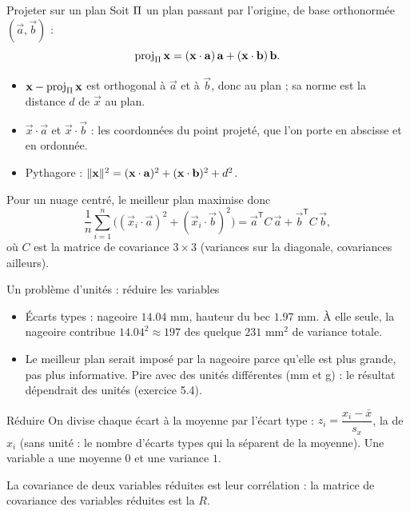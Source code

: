 \begin{frame}{Projeter sur un plan}
  \small Soit $\Pi$ un plan passant par l'origine, de base orthonormée
  $(\vec a,\vec b)$ :
  \[
    \operatorname{proj}_{\Pi}\mathbf{x}=(\mathbf{x}\cdot\mathbf{a})\,\mathbf{a}+(\mathbf{x}\cdot\mathbf{b})\,\mathbf{b} .
  \]
  \begin{itemize}
    \item $\mathbf{x}-\operatorname{proj}_{\Pi}\mathbf{x}$ est orthogonal à $\vec a$ et à
      $\vec b$, donc au plan ; sa norme est la distance $d$ de $\vec x$ au
      plan.
    \item $\vec x\cdot\vec a$ et $\vec x\cdot\vec b$ : les coordonnées du
      point projeté, que l'on porte en abscisse et en ordonnée.
    \item Pythagore :
      $\lVert \mathbf{x} \rVert^2=(\mathbf{x}\cdot\mathbf{a})^2+(\mathbf{x}\cdot\mathbf{b})^2+d^2$.
  \end{itemize}
  Pour un nuage centré, le meilleur plan maximise donc
  \[
    \frac1n\sum_{i=1}^n\Big((\vec x_i\cdot\vec a)^2+(\vec x_i\cdot\vec b)^2\Big)
    =\vec a^{\mathsf T}C\,\vec a+\vec b^{\mathsf T}C\,\vec b,
  \]
  où $C$ est la matrice de covariance $3\times3$ (variances sur la
  diagonale, covariances ailleurs).
\end{frame}

\begin{frame}{Un problème d'unités : réduire les variables}
  \small
  \begin{itemize}
    \item Écarts types : nageoire $\num{14.04}$ mm, hauteur du bec
      $\num{1.97}$ mm. À elle seule, la nageoire contribue
      $\num{14.04}^2\approx197$ des quelque $231$ mm$^2$ de variance totale.
    \item Le meilleur plan serait imposé par la nageoire parce qu'elle est
      plus grande, pas plus informative. Pire avec des unités différentes
      (mm et g) : le résultat dépendrait des unités (exercice 5.4).
  \end{itemize}
  \begin{Enonce}{Réduire}
    On divise chaque écart à la moyenne par l'écart type :
    $z_i=\dfrac{x_i-\bar x}{s_x}$, la  de $x_i$ (sans unité :
    le nombre d'écarts types qui la séparent de la moyenne). Une variable
     a une moyenne $0$ et une variance $1$.
  \end{Enonce}
  La covariance de deux variables réduites est leur corrélation : la
  matrice de covariance des variables réduites est la  $R$.
\end{frame}

